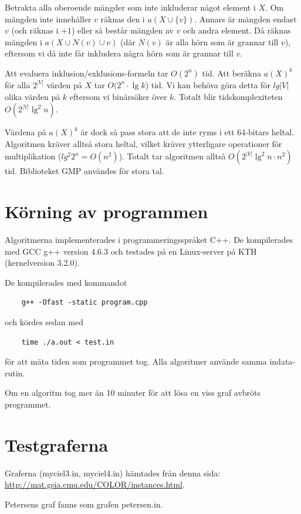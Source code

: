 \documentclass[a4paper]{report}
\begin{document}
Betrakta alla oberoende mängder som inte inkluderar något element i $X$. Om mängden inte innehåller $v$ räknas den i $a(X \cup \{v\})$. Annars är mängden endast $v$ (och räknas i $+1$)
eller så består mängden av $v$ och andra element. Då räknas mängden i $a(X \cup N(v) \cup v)$ (där $N(v)$ är alla hörn som är grannar till $v$), eftersom vi då inte får inkludera
några hörn som är grannar till $v$.

Att evaluera inklusion/exklusions-formeln tar $O(2^n)$ tid. Att beräkna $a(X)^k$ för alla $2^{|V|}$  värden på $X$ tar $O(2^n \cdot \lg k$) tid. Vi kan behöva
göra detta för $lg |V|$ olika värden på $k$ eftersom vi binärsöker över $k$. Totalt blir tidskomplexiteten $O(2^|V| \lg^2 n)$.

Värdena på $a(X)^k$ är dock så pass stora att de inte ryms i ett 64-bitars heltal. Algoritmen kräver alltså stora heltal, vilket kräver ytterligare operationer för
multiplikation ($lg^2 2^n = O(n^2)$). Totalt tar algoritmen alltså $O(2^|V| \lg^2 n \cdot n^2)$ tid. Biblioteket GMP användes för stora tal.

\chapter{Körning av programmen}
Algoritmerna implementerades i programmeringsspråket C++. De kompilerades med GCC g++ version 4.6.3 och testades på en Linux-server på KTH (kernelversion 3.2.0).

De kompilerades med kommandot
\begin{verbatim}
    g++ -Ofast -static program.cpp
\end{verbatim}

och kördes sedan med

\begin{verbatim}
    time ./a.out < test.in
\end{verbatim}

för att mäta tiden som programmet tog. Alla algoritmer använde samma indata-rutin.

Om en algoritm tog mer än 10 minuter för att lösa en viss graf avbröts programmet.

\chapter{Testgraferna}
Graferna (myciel3.in, myciel4.in) hämtades från denna sida: \url{http://mat.gsia.cmu.edu/COLOR/instances.html}.

Petersens graf fanns som grafen petersen.in.
\end{document}
